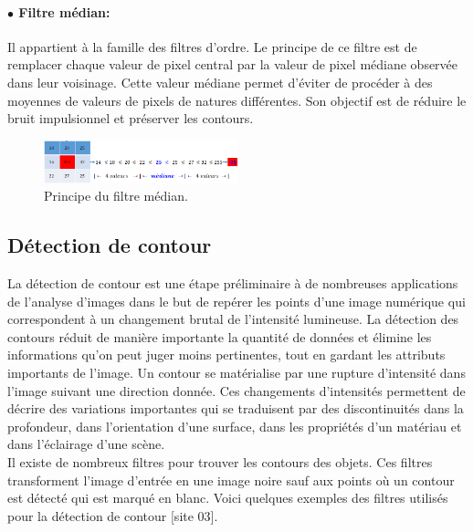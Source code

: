 \paragraph{ $\bullet$ Filtre médian:}
Il appartient à la famille des filtres d’ordre. Le principe de ce filtre est de remplacer chaque valeur de pixel central par la valeur de pixel médiane
observée dans leur voisinage. Cette valeur médiane permet d’éviter de
procéder à des moyennes de valeurs de pixels de natures différentes. Son
objectif est de réduire le bruit impulsionnel et préserver les contours.
\begin{figure}[H]
	\centering
	\includegraphics[width=0.5\textwidth]{Figures/median} 
	\caption{Principe du filtre médian.}
\end{figure}

\subsection{Détection de contour}
La détection de contour est une étape préliminaire à de nombreuses
applications de l'analyse d'images dans le but de repérer les points d’une
image numérique qui correspondent à un changement brutal de l’intensité
lumineuse. La détection des contours réduit de manière importante la
quantité de données et élimine les informations qu'on peut juger moins
pertinentes, tout en gardant les attributs importants de l'image.
Un contour se matérialise par une rupture d'intensité dans l'image
suivant une direction donnée. Ces changements d’intensités permettent de
décrire des variations importantes qui se traduisent par des discontinuités
dans la profondeur, dans l'orientation d'une surface, dans les propriétés
d'un matériau et dans l'éclairage d'une scène.\\

Il existe de nombreux filtres pour trouver les contours des objets. Ces filtres transforment l'image d'entrée en une image noire sauf aux points où un
contour est détecté qui est marqué en blanc. Voici quelques exemples des filtres utilisés pour la détection de contour [site 03].

